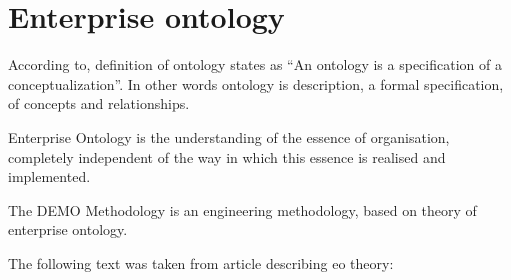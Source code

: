 \section{Enterprise ontology}
According to\cite{gruber-translation-1993}, definition of ontology states as ``An ontology is a specification of a conceptualization''. In other words ontology is description, a formal specification, of concepts and relationships.

Enterprise Ontology\cite{dietz-essence-2015} is the understanding of the essence of organisation, completely independent of the way in which this essence is realised and implemented.

The DEMO Methodology\cite{dietz-enterprise-2006} is an engineering methodology, based on theory of enterprise ontology.

The following text was taken from article describing \gls{eo} theory\cite{haan-modeling-2009}:

